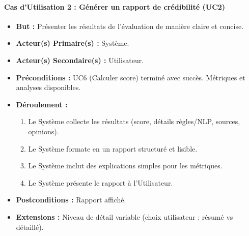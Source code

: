 \documentclass[9pt,twocolumn,french]{article}
\begin{document}
\paragraph{Cas d'Utilisation 2 : Générer un rapport de crédibilité (UC2)}
\begin{itemize}
    \item \textbf{But :} Présenter les résultats de l'évaluation de manière claire et concise.
    \item \textbf{Acteur(s) Primaire(s) :} Système.
    \item \textbf{Acteur(s) Secondaire(s) :} Utilisateur.
    \item \textbf{Préconditions :} UC6 (Calculer score) terminé avec succès. Métriques et analyses disponibles.
    \item \textbf{Déroulement  :}
        \begin{enumerate}
            \item Le Système collecte les résultats (score, détails règles/NLP, sources, opinions).
            \item Le Système formate en un rapport structuré et lisible.
            \item Le Système inclut des explications simples pour les métriques.
            \item Le Système présente le rapport à l'Utilisateur.
        \end{enumerate}
    \item \textbf{Postconditions :} Rapport affiché.
    \item \textbf{Extensions :} Niveau de détail variable (choix utilisateur : résumé vs détaillé).
\end{itemize}
\end{document}
